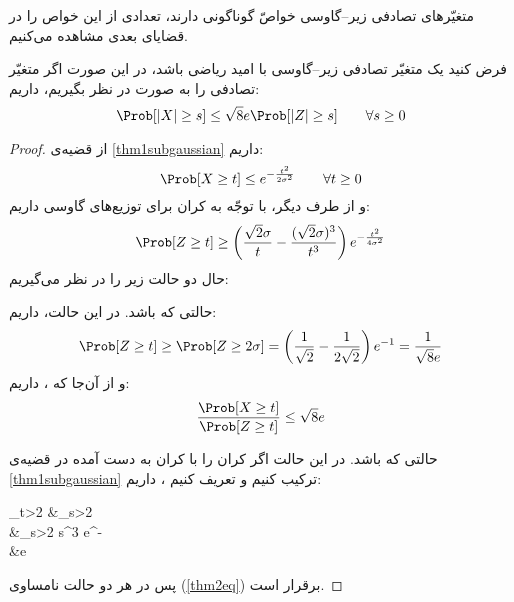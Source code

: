 	متغیّرهای تصادفی زیر--گاوسی خواصّ گوناگونی دارند، تعدادی از این خواص را در قضایای بعدی مشاهده می‌کنیم.
	
	\begin{thm}\label{thm2subgaussian}
		فرض کنید 
		یک متغیّر تصادفی زیر--گاوسی با امید ریاضی
		باشد، در این صورت اگر متغیّر تصادفی 
		را به صورت
		در نظر بگیریم، داریم:
		\begin{equation}
		\Prob[|X|\geq s] \leq \sqrt{8}e \Prob[|Z|\geq s] \qquad \forall s \geq 0
		\label{thm2eq}
		\end{equation}
	\end{thm}
	
	\begin{proof}
		از قضیه‌ی
		\ref{thm1subgaussian}
		داریم:
		\[\Prob[X\geq t] \leq e^{-\frac{t^2}{2\sigma^2}}\qquad \forall t\geq0\]
		و از طرف دیگر، با توجّه به کران
		برای توزیع‌های گاوسی داریم:
		\[\Prob[Z\geq t] \geq\left(\frac{\sqrt{2}\sigma}{t} - \frac{(\sqrt{2}\sigma)^3}{t^3} \right) e^{-\frac{t^2}{4\sigma^2}}\]
		حال دو حالت زیر را در نظر می‌گیریم:
		
		حالتی که 
		باشد. در این حالت، داریم:
		\[\Prob[Z\geq t] \geq \Prob[Z\geq 2\sigma] = \left(\frac{1}{\sqrt{2}} - \frac{1}{2\sqrt{2}} \right) e^{-1} = \frac{1}{\sqrt{8}e}\]
		و از آن‌جا که
		،
		داریم:
		\[\frac{\Prob[X\geq t]}{\Prob[Z\geq t]} \leq \sqrt{8}e\]
		
		
		حالتی که
		باشد. در این حالت اگر کران
		را با کران به دست آمده در قضیه‌ی
		\ref{thm1subgaussian}
		ترکیب کنیم و تعریف کنیم
		،
		داریم:
		\begin{flalign*}
		\sup_{t>2\sigma} \frac{\Prob[X\geq t]}{\Prob[Z\geq t]} &\leq \sup_{s>2}\\
		&\leq \sup_{s>2} s^3 e^{-}\\
		&\leq {}e
		\end{flalign*}
		پس در هر دو حالت نامساوی
		(\ref{thm2eq})
		برقرار است.		
	\end{proof}
	
